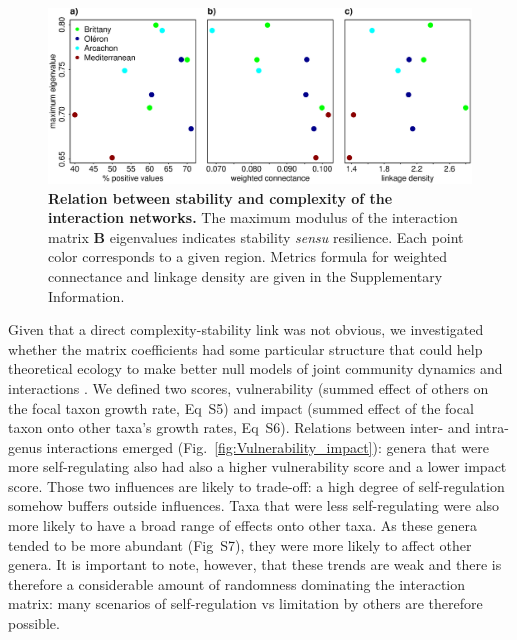 \documentclass[10pt]{article}
\begin{document}
\begin{figure}[!h]
\centering \includegraphics[width=1\textwidth]{complexity_stability_MainFig_pencenjustB}
\caption{\textbf{Relation between stability and complexity of the interaction
networks.} The maximum modulus of the interaction matrix $\mathbf{B}$
eigenvalues indicates stability \emph{sensu} resilience. Each point
color corresponds to a given region. Metrics formula for weighted
connectance and linkage density are given in the Supplementary Information.}
\label{fig:Stability-community} 
\end{figure}

Given that a direct complexity-stability link was not obvious, we
investigated whether the matrix coefficients had some particular structure
that could help theoretical ecology to make better null models of
joint community dynamics and interactions \citep{james_constructing_2015}.
We defined two scores, vulnerability (summed effect of others on the
focal taxon growth rate, Eq~S5) and impact (summed effect of the
focal taxon onto other taxa's growth rates, Eq~S6). Relations between
inter- and intra-genus interactions emerged (Fig.~\ref{fig:Vulnerability_impact}):
genera that were more self-regulating also had also a higher vulnerability
score and a lower impact score. Those two influences are likely to
trade-off: a high degree of self-regulation somehow buffers outside
influences. Taxa that were less self-regulating were also more likely
to have a broad range of effects onto other taxa. As these genera
tended to be more abundant (Fig~S7), they were more likely to affect
other genera. It is important to note, however, that these trends
are weak and there is therefore a considerable amount of randomness
dominating the interaction matrix: many scenarios of self-regulation
vs limitation by others are therefore possible.
\end{document}
